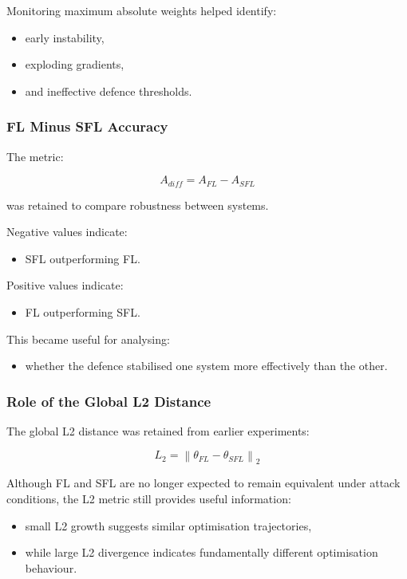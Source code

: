 Monitoring maximum absolute weights helped identify:
\begin{itemize}
    \item early instability,
    \item exploding gradients,
    \item and ineffective defence thresholds.
\end{itemize}

\subsubsection*{FL Minus SFL Accuracy}

The metric:

\[
A_{diff}
=
A_{FL}
-
A_{SFL}
\]

was retained to compare robustness between systems.

Negative values indicate:
\begin{itemize}
    \item SFL outperforming FL.
\end{itemize}

Positive values indicate:
\begin{itemize}
    \item FL outperforming SFL.
\end{itemize}

This became useful for analysing:
\begin{itemize}
    \item whether the defence stabilised one system more effectively than the other.
\end{itemize}

\subsubsection*{Role of the Global L2 Distance}

The global L2 distance was retained from earlier experiments:

\[
L_2
=
\left\|
\theta_{FL}
-
\theta_{SFL}
\right\|_2
\]

Although FL and SFL are no longer expected to remain equivalent under attack conditions, the L2 metric still provides useful information:
\begin{itemize}
    \item small L2 growth suggests similar optimisation trajectories,
    \item while large L2 divergence indicates fundamentally different optimisation behaviour.
\end{itemize}

